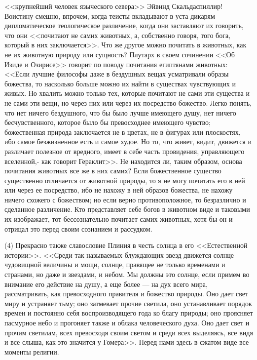 \documentclass[12pt]{article}
\begin{document}
<<крупнейший человек языческого севера>> Эйвинд Скальдаспиллир! Воистину смешно, впрочем, когда теисты вкладывают в уста дикарям дипломатическое теологическое различение, когда они заставляют их говорить, что они <<почитают не самих животных, а, собственно говоря, того бога, который в них заключается>>. Что же другое можно почитать в животных, как не их животную природу или сущность? Плутарх в своем сочинении <<Об Изиде и Озирисе>> говорит по поводу почитания египтянами животных: <<Если лучшие философы даже в бездушных вещах усматривали образы божества, то насколько больше можно их найти в существах чувствующих и живых. Но хвалить можно только тех, которые почитают не сами эти существа и не сами эти вещи, но через них или через их посредство божество. Легко понять, что нет ничего бездушного, что бы было лучше имеющего душу, нет ничего бесчувственного, которое было бы превосходнее имеющего чувство; божественная природа заключается не в цветах, не в фигурах или плоскостях, ибо самое безжизненное есть и самое худое. Но то, что живет, видит, движется и различает полезное от вредного, имеет в себе часть провидения, управляющего вселенной,- как говорит Гераклит>>. Не находится ли, таким образом, основа почитания животных все же в них самих? Если божественное существо существенно отличается от животной природы, то я не могу почитать его в ней или через ее посредство, ибо не нахожу в ней образов божества, не нахожу ничего схожего с божеством; но если верно противоположное, то безразлично и сделанное различение. Кто представляет себе богов в животном виде и таковыми их изображает, тот бессознательно почитает самих животных, хотя бы он и отрицал это перед своим сознанием и рассудком. 

(4) Прекрасно также славословие Плиния в честь солнца в его <<Естественной истории>>. <<Среди так называемых блуждающих звезд движется солнце чудовищной величины и мощи, солнце, правящее не только временами и странами, но даже и звездами, и небом. Мы должны это солнце, если примем во внимание его действие на душу, а еще более --- на дух всего мира, рассматривать, как превосходного правителя и божество природы. Оно дает свет миру и устраняет тьму; оно затмевает прочие светила, оно устанавливает порядок времен и постоянно себя воспроизводящего года ко благу природы; оно проясняет пасмурное небо и прогоняет также и облака человеческого духа. Оно дает свет и прочим светилам, всех превосходя своим светом и среди всех выделяясь, все видя и все слыша, как это значится у Гомера>>. Перед нами здесь в сжатом виде все моменты религии. 
\end{document}
